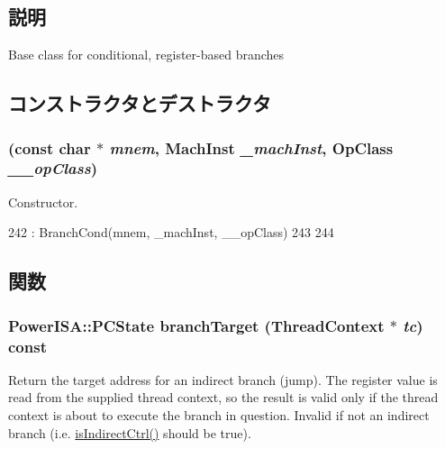 \subsection{説明}
Base class for conditional, register-\/based branches 

\subsection{コンストラクタとデストラクタ}
\hypertarget{classPowerISA_1_1BranchRegCond_a65f92ac725cc9dfcf11226bd01830405}{
\subsubsection[{BranchRegCond}]{ (const char $\ast$ {\em mnem}, \/  {\bf MachInst} {\em \_\-machInst}, \/  OpClass {\em \_\-\_\-opClass})}}
\label{classPowerISA_1_1BranchRegCond_a65f92ac725cc9dfcf11226bd01830405}


Constructor. 


\begin{DoxyCode}
242         : BranchCond(mnem, _machInst, __opClass)
243     {
244     }
\end{DoxyCode}


\subsection{関数}
\hypertarget{classPowerISA_1_1BranchRegCond_a22dbdbb7032b55b56b13139ebe091dfe}{
\subsubsection[{branchTarget}]{\setlength{\rightskip}{0pt plus 5cm}PowerISA::PCState branchTarget ({\bf ThreadContext} $\ast$ {\em tc}) const}}
\label{classPowerISA_1_1BranchRegCond_a22dbdbb7032b55b56b13139ebe091dfe}
Return the target address for an indirect branch (jump). The register value is read from the supplied thread context, so the result is valid only if the thread context is about to execute the branch in question. Invalid if not an indirect branch (i.e. \hyperlink{classStaticInst_a5dfa427a48589c4c910416a67808510f}{isIndirectCtrl()} should be true). 

